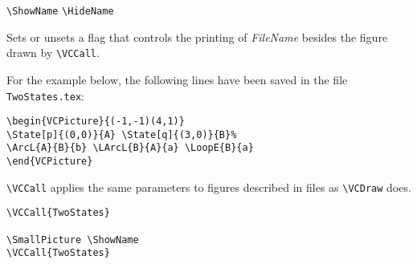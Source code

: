 \documentclass[11pt,twoside]{article}
\newlength{\ColoText}%
\newlength{\ColoFigu}%
\newlength{\parindenttemp} %
\newcommand{\noi}{\noindent}
\newcommand{\ee}{\text{\qquad}}               %
\newlength{\jsIndent}%
\newlength{\ColSource}%
\newlength{\ColFigur}%
\begin{document}
\medskip
\noi 
\hspace*{-\jsIndent}
\begin{minipage}[t]{\ColoText}
        \par\vspace*{0mm}%
        \footnotesize
\verb+\ShowName+ \ee 
\verb+\HideName+ 
\normalsize
\end{minipage}%
\hspace*{1.2em}%
\begin{minipage}[t]{\ColoFigu}%
\par\vspace*{0mm}%
Sets or unsets a flag that controls the printing of  
\textsl{FileName} besides the figure drawn by \verb+\VCCall+.
\end{minipage}%

\medskip
\noi
For the example below, the following lines have been saved in the 
file \verb+TwoStates.tex+:
\small
\begin{verbatim}
\begin{VCPicture}{(-1,-1)(4,1)}
\State[p]{(0,0)}{A} \State[q]{(3,0)}{B}%
\ArcL{A}{B}{b} \LArcL{B}{A}{a} \LoopE{B}{a}
\end{VCPicture}
\end{verbatim}
\normalsize 

\verb+\VCCall+ applies the same parameters to figures described
in files as \verb+\VCDraw+ does. 

\noi 
\hspace*{-\jsIndent}
\begin{minipage}[c]{\ColFigur}%
\par\vspace*{0mm}%
\ee {}

\medskip

\SmallPicture \ShowName 
\ee {}
\end{minipage}%
\hspace*{1.2em}%
\begin{minipage}[c]{\ColSource}
\setlength{\parindent}{\parindenttemp}%
\par\vspace*{0mm}%
\footnotesize
\begin{verbatim}
\VCCall{TwoStates}

\SmallPicture \ShowName 
\VCCall{TwoStates}
\end{verbatim}
\normalsize
\end{minipage}%
\end{document}
